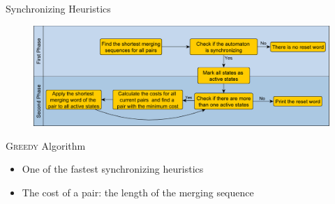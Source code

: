 \documentclass{beamer}
\begin{document}
\begin{frame}{Synchronizing Heuristics}
	\begin{figure}
		\includegraphics[width=\textwidth]{figs/heuristic_flow.pdf}
	\end{figure}
\end{frame}

\begin{frame}{\textsc{Greedy} Algorithm}
	\begin{itemize}
		\item One of the fastest synchronizing heuristics
		\item The cost of a pair: the length of the merging sequence
	\end{itemize}
\end{frame}
%
%	
%	
%
%	
%	
%		
%		
\end{document}
